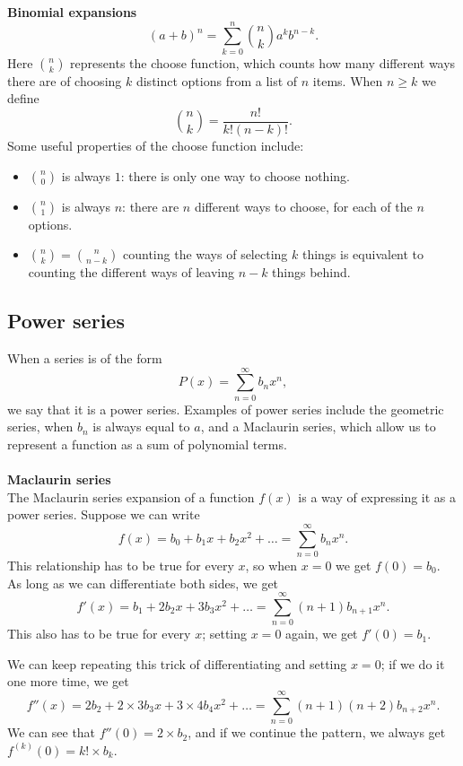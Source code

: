 \documentclass[10pt, a4paper]{article}
\begin{document}
\textbf{Binomial expansions}
\[
(a + b) ^ n = \sum_{k = 0}^{n}{\binom{n}{k}a ^ k b ^ {n - k}}.
\]
Here $\binom{n}{k}$ represents the choose function, which counts how many different ways there are of choosing $k$ distinct options from a list of $n$ items. When $n \geq k$ we define
\[
\binom{n}{k} = \dfrac{n!}{k!(n - k)!}.
\]
Some useful properties of the choose function include:
\begin{itemize}
    \item $\binom{n}{0}$ is always $1$: there is only one way to choose nothing.
    \item $\binom{n}{1}$ is always $n$: there are $n$ different ways to choose, for each of the $n$ options.
    \item $\binom{n}{k} = \binom{n}{n - k}$ counting the ways of selecting $k$ things is equivalent to counting the different ways of leaving $n - k$ things behind.
\end{itemize}

\subsection{Power series}
When a series is of the form
\[
P(x) = \sum_{n = 0}^{\infty}b_n x ^ n,
\]
we say that it is a power series. Examples of power series include the geometric series, when $b_n$ is always equal to $a$, and a Maclaurin series, which allow us to represent a function as a sum of polynomial terms. \\
\\
\textbf{Maclaurin series} \\
The Maclaurin series expansion of a function $f(x)$ is a way of expressing it as a power series. Suppose we can write
\[
f(x) = b_0 + b_1 x + b_2 x ^ 2 + \dots = \sum_{n = 0}^{\infty}b_n x ^ n.
\]
This relationship has to be true for every $x$, so when $x = 0$ we get $f(0) = b_0$. \\
As long as we can differentiate both sides, we get
\[
f'(x) = b_1 + 2b_2 x + 3b_3 x ^ 2 + \dots = \sum_{n = 0}^{\infty}(n + 1)b_{n + 1} x ^ n.
\]
This also has to be true for every $x$; setting $x = 0$ again, we get $f'(0) = b_1$.

We can keep repeating this trick of differentiating and setting $x = 0$; if we do it one more time, we get
\[
f''(x) = 2b_2 + 2 \times 3b_3 x + 3 \times 4b_4 x ^ 2 + \dots = \sum_{n = 0}^{\infty}(n + 1)(n + 2)b_{n + 2} x ^ n.
\]
We can see that $f''(0) = 2 \times b_2$, and if we continue the pattern, we always get $f^{(k)}(0) = k! \times b_k$.
\end{document}
